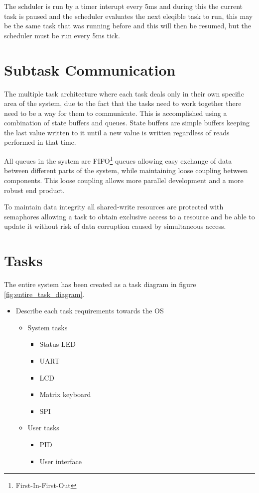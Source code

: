 \documentclass[../../../main]{subfiles}
\begin{document}
The schduler is run by a timer interupt every 5ms and during this the current task is paused and the scheduler evaluates the next eleqible task to run, this may be the same task that was running before and this will then be resumed, but the scheduler must be run every 5ms tick.

\section{Subtask Communication}

The multiple task architecture where each task deals only in their own specific area of the system, due to the fact that the tasks need to work together there need to be a way for them to communicate.
This is accomplished using a combination of state buffers and queues. State buffers are simple buffers keeping the last value written to it until a new value is written regardless of reads performed in that time.

All queues in the system are FIFO\footnote{First-In-First-Out} queues allowing easy exchange of data between different parts of the system, while maintaining loose coupling between components. This loose coupling allows more parallel development and a more robust end product. 

To maintain data integrity all shared-write resources are protected with semaphores allowing a task to obtain exclusive access to a resource and be able to update it without risk of data corruption caused by simultaneous access.

\section{Tasks}

The entire system has been created as a task diagram in figure \ref{fig:entire_task_diagram}. 


\begin{itemize}
    \item Describe each task requirements towards the OS
        \begin{itemize}
            \item System tasks
                \begin{itemize}
                    \item Status LED
                    \item UART 
                    \item LCD
                    \item Matrix keyboard
                    \item SPI
                \end{itemize}
                 \item User tasks
                \begin{itemize}
                    \item PID
                    \item User interface
                \end{itemize}
        \end{itemize}
\end{itemize}
\end{document}
